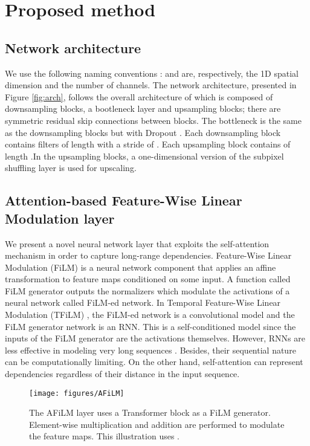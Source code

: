 \documentclass{article}
\begin{document}
\section{Proposed method} 
\label{sec:afilm}

\subsection{Network architecture} 
\label{subsec:arch}
We use the following naming conventions :  and  are, respectively, the 1D spatial dimension and the number of channels. The network architecture, presented in Figure \ref{fig:arch}, follows the overall architecture of \cite{kuleshov2017audio, birnbaum2019temporal} which is composed of  downsampling blocks, a bootleneck layer and  upsampling blocks; there are symmetric residual skip connections \cite{he2016deep} between blocks. The bottleneck is the same as the downsampling blocks but with Dropout \cite{srivastava2014dropout}. Each downsampling block  contains  filters of length  with a stride of . Each upsampling block  contains  of length  .In the upsampling blocks, a one-dimensional version of the subpixel shuffling layer \cite{shi2016real} is used for upscaling.

\subsection{Attention-based Feature-Wise Linear Modulation layer} 
\label{subsec:afilm}
We present a novel neural network layer that exploits the self-attention mechanism in order to capture long-range dependencies. Feature-Wise Linear Modulation (FiLM) \cite{perez2017film} is a neural network component that applies an affine transformation to feature maps conditioned on some input. A function called FiLM generator outputs the normalizers  which modulate the activations of a neural network called  FiLM-ed network. In Temporal Feature-Wise Linear Modulation (TFiLM) \cite{birnbaum2019temporal}, the FiLM-ed network is a convolutional model and the FiLM generator network is an RNN. This is a self-conditioned model since the inputs of the FiLM generator are the activations themselves. However, RNNs are less effective in modeling very long sequences \cite{bengio1994learning}. Besides, their sequential nature can be computationally limiting. On the other hand, self-attention can represent dependencies regardless of their distance in the input sequence.

\begin{figure*}[htb]
    \centering
    \texttt{[image: figures/AFiLM]}
    \caption{The AFiLM layer uses a Transformer block as a FiLM generator. Element-wise multiplication and addition are performed to modulate the feature maps. This illustration uses .}
    \label{fig:atfilm}
\end{figure*}
\end{document}

